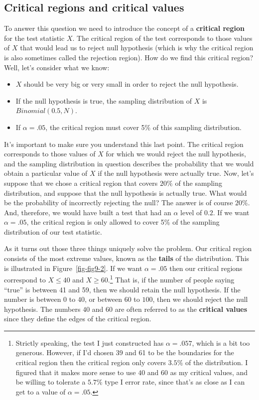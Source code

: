 \documentclass[
  a4paper,
]{book}
\providecommand{\tightlist}{%
  \setlength{\itemsep}{0pt}\setlength{\parskip}{0pt}}
\begin{document}
\subsection{Critical regions and critical
values}\label{critical-regions-and-critical-values}

To answer this question we need to introduce the concept of a
\textbf{critical region} for the test statistic \(X\). The critical
region of the test corresponds to those values of \(X\) that would lead
us to reject null hypothesis (which is why the critical region is also
sometimes called the rejection region). How do we find this critical
region? Well, let's consider what we know:

\begin{itemize}
\tightlist
\item
  \(X\) should be very big or very small in order to reject the null
  hypothesis.
\item
  If the null hypothesis is true, the sampling distribution of \(X\) is
  \(Binomial(0.5, N)\).
\item
  If \(\alpha = .05\), the critical region must cover 5\% of this
  sampling distribution.
\end{itemize}

It's important to make sure you understand this last point. The critical
region corresponds to those values of \(X\) for which we would reject
the null hypothesis, and the sampling distribution in question describes
the probability that we would obtain a particular value of \(X\) if the
null hypothesis were actually true. Now, let's suppose that we chose a
critical region that covers \(20\%\) of the sampling distribution, and
suppose that the null hypothesis is actually true. What would be the
probability of incorrectly rejecting the null? The answer is of course
\(20\%\). And, therefore, we would have built a test that had an
\(\alpha\) level of \(0.2\). If we want \(\alpha = .05\), the critical
region is only allowed to cover 5\% of the sampling distribution of our
test statistic.

As it turns out those three things uniquely solve the problem. Our
critical region consists of the most extreme values, known as the
\textbf{tails} of the distribution. This is illustrated in
Figure~\ref{fig-fig9-2}. If we want \(\alpha = .05\) then our critical
regions correspond to \(X \leq 40\) and \(X \geq 60\).\footnote{Strictly
  speaking, the test I just constructed has \(\alpha = .057\), which is
  a bit too generous. However, if I'd chosen 39 and 61 to be the
  boundaries for the critical region then the critical region only
  covers \(3.5\%\) of the distribution. I figured that it makes more
  sense to use \(40\) and \(60\) as my critical values, and be willing
  to tolerate a \(5.7\%\) type I error rate, since that's as close as I
  can get to a value of \(\alpha = .05\).} That is, if the number of
people saying ``true'' is between 41 and 59, then we should retain the
null hypothesis. If the number is between \(0\) to \(40\), or between
\(60\) to \(100\), then we should reject the null hypothesis. The
numbers \(40\) and \(60\) are often referred to as the \textbf{critical
values} since they define the edges of the critical region.
\end{document}

